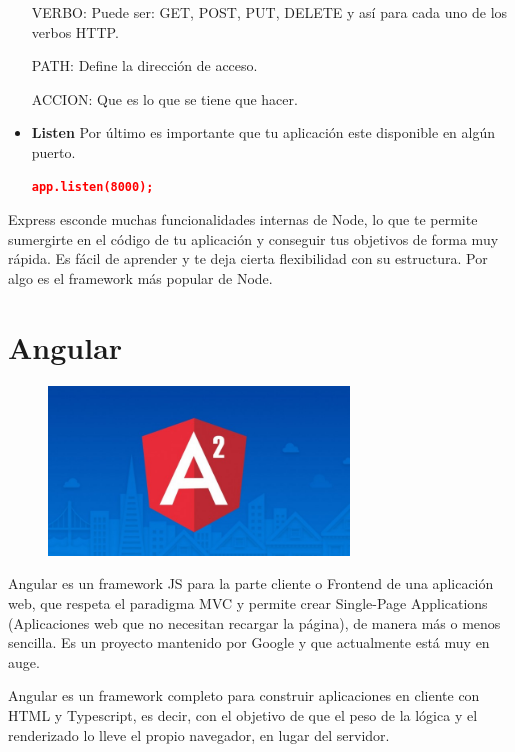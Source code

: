 \begin{itemize}
   VERBO: Puede ser: GET, POST, PUT, DELETE y así para cada uno de los verbos HTTP. 
   
   PATH: Define la dirección de acceso.
   
   ACCION: Que es lo que se tiene que hacer.
   
   \item \textbf{Listen} Por último es importante que tu aplicación este disponible en algún puerto.
   \begin{lstlisting}[language=JSON] 
    app.listen(8000);
   \end{lstlisting}
   
\end{itemize}

Express esconde muchas funcionalidades internas de Node, lo que te permite sumergirte en el código de tu aplicación y conseguir tus objetivos de forma muy rápida. Es fácil de aprender y te deja cierta flexibilidad con su estructura.
Por algo es el framework más popular de Node. 

\section{Angular }

\begin{figure}[H]
    \centering
    \includegraphics[width=80mm]{memoria/LaTeX/img/infraestructura/a22.jpg}
\end{figure}


Angular es un framework JS para la parte cliente o Frontend de una aplicación web, que respeta el paradigma MVC y permite crear Single-Page Applications (Aplicaciones web que no necesitan recargar la página), de manera más o menos sencilla. Es un proyecto mantenido por Google y que actualmente está muy en auge.

Angular es un framework completo para construir aplicaciones en cliente con HTML y Typescript, es decir, con el objetivo de que el peso de la lógica y el renderizado lo lleve el propio navegador, en lugar del servidor.

